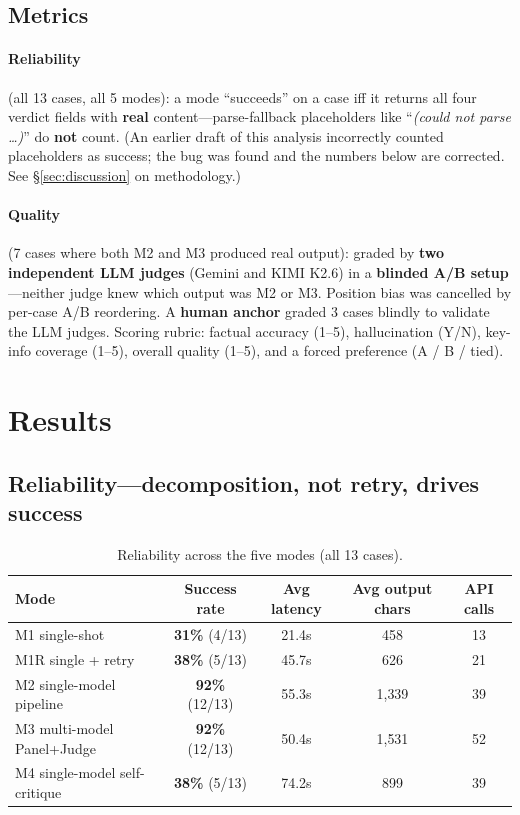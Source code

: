 \documentclass[11pt]{article}
\begin{document}
\subsection{Metrics}

\paragraph{Reliability} (all 13 cases, all 5 modes): a mode ``succeeds'' on a
case iff it returns all four verdict fields with \textbf{real} content---parse-fallback
placeholders like ``\textit{(could not parse \ldots)}'' do \textbf{not} count.
(An earlier draft of this analysis incorrectly counted placeholders as success;
the bug was found and the numbers below are corrected. See \S\ref{sec:discussion}
on methodology.)

\paragraph{Quality} (7 cases where both M2 and M3 produced real output): graded
by \textbf{two independent LLM judges} (Gemini and KIMI K2.6) in a \textbf{blinded
A/B setup}---neither judge knew which output was M2 or M3. Position bias was
cancelled by per-case A/B reordering. A \textbf{human anchor} graded 3 cases
blindly to validate the LLM judges. Scoring rubric: factual accuracy (1--5),
hallucination (Y/N), key-info coverage (1--5), overall quality (1--5), and a
forced preference (A / B / tied).

\section{Results}

\subsection{Reliability---decomposition, not retry, drives success}

\begin{table}[h]
\centering
\small
\caption{Reliability across the five modes (all 13 cases).}
\label{tab:reliability}
\begin{tabular}{@{}lcccc@{}}
\toprule
\textbf{Mode} & \textbf{Success rate} & \textbf{Avg latency} & \textbf{Avg output chars} & \textbf{API calls} \\
\midrule
M1 single-shot                   & \textbf{31\%} (4/13)  & 21.4s & 458   & 13 \\
M1R single + retry               & \textbf{38\%} (5/13)  & 45.7s & 626   & 21 \\
M2 single-model pipeline         & \textbf{92\%} (12/13) & 55.3s & 1{,}339 & 39 \\
M3 multi-model Panel+Judge       & \textbf{92\%} (12/13) & 50.4s & 1{,}531 & 52 \\
M4 single-model self-critique    & \textbf{38\%} (5/13)  & 74.2s & 899   & 39 \\
\bottomrule
\end{tabular}
\end{table}
\end{document}
